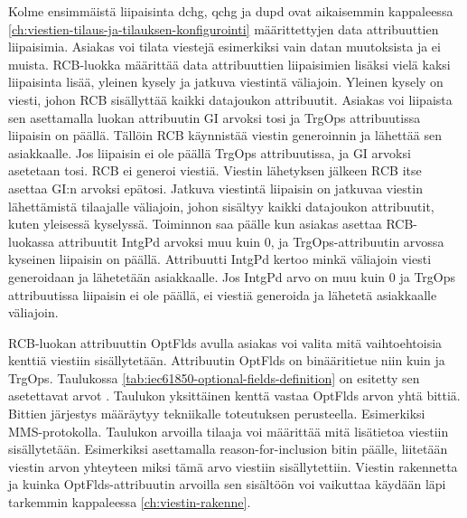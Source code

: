 Kolme ensimmäistä liipaisinta dchg, qchg ja dupd ovat aikaisemmin kappaleessa \ref{ch:viestien-tilaus-ja-tilauksen-konfigurointi} määrittettyjen data attribuuttien liipaisimia. Asiakas voi tilata viestejä esimerkiksi vain datan muutoksista ja ei muista. RCB-luokka määrittää data attribuuttien liipaisimien lisäksi vielä kaksi liipaisinta lisää, yleinen kysely ja jatkuva viestintä väliajoin. Yleinen kysely on viesti, johon RCB sisällyttää kaikki datajoukon attribuutit. Asiakas voi liipaista sen asettamalla luokan attribuutin GI arvoksi tosi ja TrgOps attribuutissa liipaisin on päällä. Tällöin RCB käynnistää viestin generoinnin ja lähettää sen asiakkaalle. Jos liipaisin ei ole päällä TrgOps attribuutissa, ja GI arvoksi asetetaan tosi. RCB ei generoi viestiä. Viestin lähetyksen jälkeen RCB itse asettaa GI:n arvoksi epätosi. Jatkuva viestintä liipaisin on jatkuvaa viestin lähettämistä tilaajalle väliajoin, johon sisältyy kaikki datajoukon attribuutit, kuten yleisessä kyselyssä. Toiminnon saa päälle kun asiakas asettaa RCB-luokassa attribuutit IntgPd arvoksi muu kuin 0, ja TrgOps-attribuutin arvossa kyseinen liipaisin on päällä. Attribuutti IntgPd kertoo minkä väliajoin viesti generoidaan ja lähetetään asiakkaalle. Jos IntgPd arvo on muu kuin 0 ja TrgOps attribuutissa liipaisin ei ole päällä, ei viestiä generoida ja lähetetä asiakkaalle väliajoin.

RCB-luokan attribuuttin OptFlds avulla asiakas voi valita mitä vaihtoehtoisia kenttiä viestiin sisällytetään. Attribuutin OptFlds on binääritietue niin kuin ja TrgOps. Taulukossa \ref{tab:iec61850-optional-fields-definition} on esitetty sen asetettavat arvot \cite[s.~98]{IEC61850-7-2}. Taulukon yksittäinen kenttä vastaa OptFlds arvon yhtä bittiä. Bittien järjestys määräytyy tekniikalle toteutuksen perusteella. Esimerkiksi MMS-protokolla. Taulukon arvoilla tilaaja voi määrittää mitä lisätietoa viestiin sisällytetään. Esimerkiksi asettamalla reason-for-inclusion bitin päälle, liitetään viestin arvon yhteyteen miksi tämä arvo viestiin sisällytettiin. Viestin rakennetta ja kuinka OptFlds-attribuutin arvoilla sen sisältöön voi vaikuttaa käydään läpi tarkemmin kappaleessa \ref{ch:viestin-rakenne}.

